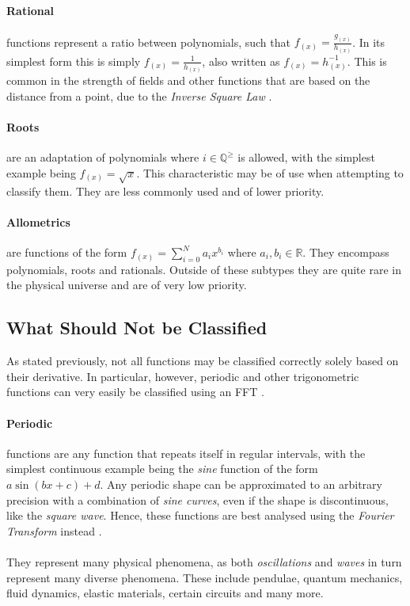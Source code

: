 \documentclass[main.tex]{subfiles}
\begin{document}
      \paragraph{Rational} functions represent a ratio between polynomials, such that $f_{(x)}=\frac{g_{(x)}}{h_{(x)}}$. In its simplest form this is simply $f_{(x)}=\frac{1}{h_{(x)}}$, also written as $f_{(x)}=h_{(x)}^{-1}$. This is common in the strength of fields and other functions that are based on the distance from a point, due to the \textit{Inverse Square Law} \cite{}. 
      \paragraph{Roots} are an adaptation of polynomials where $i \in \mathbb{Q}^\geq$ is allowed, with the simplest example being $f_{(x)}=\sqrt{x}$. This characteristic may be of use when attempting to classify them. They are less commonly used and of lower priority.
      \paragraph{Allometrics} are functions of the form $f_{(x)}=\sum_{i=0}^{N} a_i x^{b_i} $ where $a_i,b_i \in \mathbb{R}$. They encompass polynomials, roots and rationals. Outside of these subtypes they are quite rare in the physical universe and are of very low priority.
    
    \subsection{What Should Not be Classified}
      
      As stated previously, not all functions may be classified correctly solely based on their derivative. In particular, however, periodic and other trigonometric functions can very easily be classified using an FFT \cite{}.
      \paragraph{Periodic} functions are any function that repeats itself in regular intervals, with the simplest continuous example being the \textit{sine} function of the form $a \sin(b x + c) + d$. Any periodic shape can be approximated to an arbitrary precision with a combination of \textit{sine curves}, even if the shape is discontinuous, like the \textit{square wave}. Hence, these functions are best analysed using the \textit{Fourier Transform} instead \cite{}.
      \\\\
      They represent many physical phenomena, as both \textit{oscillations} and \textit{waves} in turn represent many diverse phenomena. These include pendulae, quantum mechanics, fluid dynamics, elastic materials, certain circuits and many more.
\end{document}
